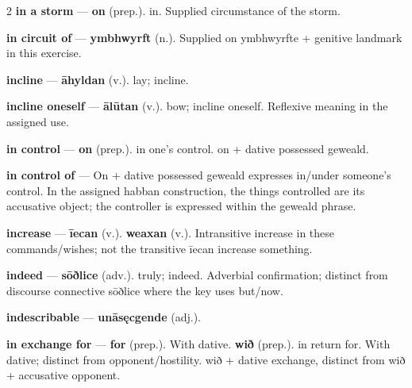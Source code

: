 \begin{multicols}{2}
\textbf{in a storm} — \textbf{on} (prep.). in. Supplied circumstance of the storm.\par
\textbf{in circuit of} — \textbf{ymbhwyrft} (n.). Supplied on ymbhwyrfte + genitive landmark in this exercise.\par
\textbf{incline} — \textbf{āhyldan} (v.). lay; incline.\par
\textbf{incline oneself} — \textbf{ālūtan} (v.). bow; incline oneself. Reflexive meaning in the assigned use.\par
\textbf{in control} — \textbf{on} (prep.). in one's control. on + dative possessed geweald.\par
\textbf{in control of} — On + dative possessed geweald expresses in/under someone’s control. In the assigned habban construction, the things controlled are its accusative object; the controller is expressed within the geweald phrase.\par
\textbf{increase} — \textbf{īecan} (v.).  \textbf{weaxan} (v.). Intransitive increase in these commands/wishes; not the transitive īecan increase something.\par
\textbf{indeed} — \textbf{sōðlice} (adv.). truly; indeed. Adverbial confirmation; distinct from discourse connective sōðlice where the key uses but/now.\par
\textbf{indescribable} — \textbf{unāsęcgende} (adj.).\par
\textbf{in exchange for} — \textbf{for} (prep.). With dative. \textbf{wið} (prep.). in return for. With dative; distinct from opponent/hostility. wið + dative exchange, distinct from wið + accusative opponent.\par

\end{multicols}
